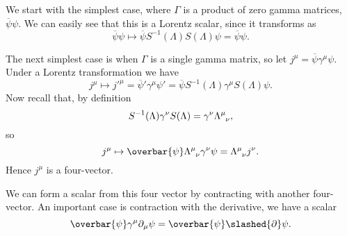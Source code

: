\documentclass[fleqn]{NotesClass}
\newcommand{\diracadjoint}[1]{\overbar{#1}}
\begin{document}
    We start with the simplest case, where \(\Gamma\) is a product of zero gamma matrices, \(\diracadjoint{\psi}\psi\).
    We can easily see that this is a Lorentz scalar, since it transforms as
    \begin{equation}
        \diracadjoint{\psi}\psi \mapsto \diracadjoint{\psi}S^{-1}(\Lambda)S(\Lambda)\psi = \diracadjoint{\psi}\psi.
    \end{equation}
    
    The next simplest case is when \(\Gamma\) is a single gamma matrix, so let \(j^\mu = \diracadjoint{\psi}\gamma^\mu\psi\).
    Under a Lorentz transformation we have
    \begin{equation}
        j^\mu \mapsto j'^\mu = \diracadjoint{\psi}'\gamma^\mu\psi' = \diracadjoint{\psi}S^{-1}(\Lambda)\gamma^\mu S(\Lambda) \psi.
    \end{equation}
    Now recall that, by definition
    \begin{equation}
        S^{-1}(\Lambda) \gamma^\nu S(\Lambda) = \gamma^\nu \tensor{\Lambda}{^\mu_\nu},
    \end{equation}
    so
    \begin{equation}
        j^\mu \mapsto \diracadjoint{\psi}\tensor{\Lambda}{^\mu_\nu}\gamma^\nu \psi = \tensor{\Lambda}{^\mu_\nu} j^\nu.
    \end{equation}
    Hence \(j^\mu\) is a four-vector.
    
    We can form a scalar from this four vector by contracting with another four-vector.
    An important case is contraction with the derivative, we have a scalar
    \begin{equation}
        \diracadjoint{\psi}\gamma^\mu\partial_\mu\psi = \diracadjoint{\psi}\slashed{\partial}\psi.
    \end{equation}
    
\end{document}
